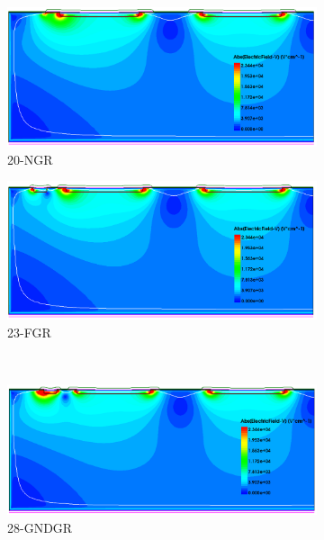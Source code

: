 \begin{figure}[htbp]
  \centering
  \begin{subfigure}[b]{0.5\linewidth}
    \includegraphics[width=\textwidth]{figures/ActiveEdge/Efield_20_NGR.png}
    \caption{20-NGR}
  \end{subfigure}\hfill
  \begin{subfigure}[b]{0.5\linewidth}
    \includegraphics[width=\textwidth]{figures/ActiveEdge/Efield_23_FGR.png}
    \caption{23-FGR}
  \end{subfigure} \\
  \begin{subfigure}[b]{0.5\linewidth}
    \includegraphics[width=\textwidth]{figures/ActiveEdge/Efield_28_GNDGR.png}
    \caption{28-GNDGR}
  \end{subfigure}\hfill
  \begin{subfigure}[b]{0.5\linewidth}

\end{subfigure}
\end{figure}

